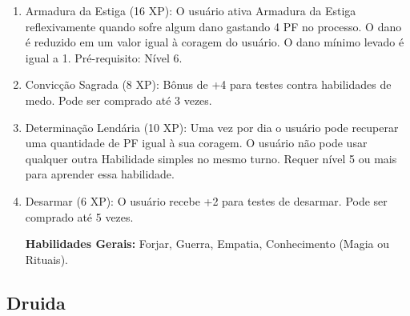 \begin{enumerate}
	\item Armadura da Estiga (16 XP): O usuário ativa Armadura da Estiga reflexivamente quando sofre algum dano gastando 4 PF no processo. O dano é reduzido em um valor igual à coragem do usuário. O dano mínimo levado é igual a 1. Pré-requisito: Nível 6. 

 	\item Convicção Sagrada (8 XP): Bônus de +4 para testes contra habilidades de medo. Pode ser comprado até 3 vezes.

\item Determinação Lendária (10 XP): Uma vez por dia o usuário pode recuperar uma quantidade de PF igual à sua coragem. O usuário não pode usar qualquer outra Habilidade simples no mesmo turno. Requer nível 5 ou mais para aprender essa habilidade. 

 	\item Desarmar (6 XP): O usuário recebe +2 para testes de desarmar. Pode ser comprado até 5 vezes.
  
\textbf{Habilidades Gerais:} Forjar, Guerra, Empatia, Conhecimento (Magia ou Rituais).
 

\end{enumerate}
 
 
  \subsection{Druida}  
  
